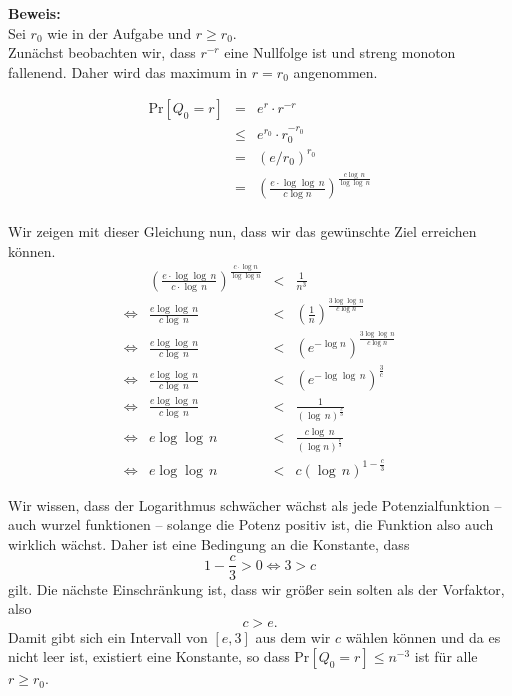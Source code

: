 \documentclass[11pt,a4paper,ngerman]{article}
\newcommand{\prob}[1]{\text{Pr}\left[ #1 \right]}
\begin{document}
\noindent\textbf{Beweis:}\\

Sei $r_0$ wie in der Aufgabe und $r \geq r_0$.\\

Zunächst beobachten wir, dass $r^{-r}$ eine Nullfolge ist und streng monoton fallenend. Daher wird das maximum in $r = r_0$ angenommen.

$$\begin{array}{rcl}
	\prob{Q_0 = r} &=& e^r \cdot r^{-r}\\
			&\leq& e^{r_0} \cdot r_0^{-r_0}\\
			&=& (e / r_0)^{r_0}\\
			&=& \left(\frac{e \cdot \log \log \, n}{c \log n}\right)^\frac{c \log \, n}{\log \log \, n}\\
\end{array}$$

Wir zeigen mit dieser Gleichung nun, dass wir das gewünschte Ziel erreichen können.
$$\begin{array}{crcl}
	&\left(\frac{e\cdot \log \log \, n}{c \cdot \log \, n}\right)^\frac{c \cdot \log n}{\log \log n} &<& \frac{1}{n^3}\\
\Leftrightarrow & \frac{e\log \log \, n}{c\log \, n} &<& \left(\frac{1}{n}\right)^\frac{3\log \log \, n}{c\log n}\\
\Leftrightarrow & \frac{e\log \log \, n}{c\log \, n} &<& \left(e^{- \log n} \right)^\frac{3\log \log \, n}{c\log n}\\
\Leftrightarrow & \frac{e\log \log \, n }{c\log \, n} &<& \left(e^{- \log \log \, n}\right)^\frac{3}{c}\\
\Leftrightarrow & \frac{e\log \log \, n}{c\log \, n} &<& \frac{1}{\left(\log \, n\right)^\frac{c}{3}}\\
\Leftrightarrow & e \log \log \, n &<& \frac{c \log \, n}{(\log n)^\frac{c}{3}}\\
\Leftrightarrow & e \log \log \, n &<& c (\log \, n)^{1 - \frac{c}{3}}
\end{array}$$

Wir wissen, dass der Logarithmus schwächer wächst als jede Potenzialfunktion -- auch wurzel funktionen -- solange die Potenz positiv ist, die Funktion also auch wirklich wächst. Daher ist eine Bedingung an die Konstante, dass 
$$
	1 - \frac{c}{3} > 0 \Leftrightarrow 3 > c
$$
gilt. Die nächste Einschränkung ist, dass wir größer sein solten als der Vorfaktor, also
$$
	c > e.
$$
Damit gibt sich ein Intervall von $[e,3]$ aus dem wir $c$ wählen können und da es nicht leer ist, existiert eine Konstante, so dass
$\prob{Q_0 = r} \leq n^{-3}$ ist für alle $r \geq r_0$.\\
\end{document}
